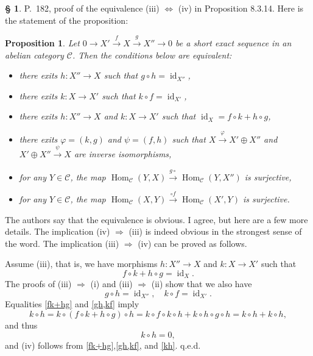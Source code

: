 \documentclass[12pt]{article}
\newtheorem{prop}[thm]{Proposition}
\theoremstyle{remark}
\theoremstyle{definition}
\newtheorem{s}[thm]{\S}
\newcommand{\C}{\mathcal C}
\newcommand{\pp}{\varphi}
\newcommand{\then}{\Rightarrow}
\newcommand{\ssi}{\Leftrightarrow}%
\newcommand{\xr}{\xrightarrow}
\DeclareMathOperator{\id}{id}
\DeclareMathOperator{\Hom}{Hom}%
\begin{document}
\begin{s} 
P.~182, proof of the equivalence (iii) $\ssi$ (iv) in Proposition 8.3.14. Here is the statement of the proposition:
%
\begin{prop}
Let $0\to X'\xr fX\xr gX''\to0$ be a short exact sequence in an abelian category $\C$. Then the conditions below are equivalent:
\begin{itemize}
\item[\em(i)] there exits $h:X''\to X$ such that $g\circ h=\id_{X''}$,
\item[\em(ii)] there exits $k:X\to X'$ such that $k\circ f=\id_{X'}$,
\item[\em(iii)] there exits $h:X''\to X$ and $k:X\to X'$ such that $\id_X=f\circ k+h\circ g$,
\item[\em(iv)] there exits $\pp=(k,g)$ and $\psi=(f,h)$ such that $X\xr\pp X'\oplus X''$ and $X'\oplus X''\xr\psi X$ are inverse isomorphisms,
\item[\em(v)] for any $Y\in\C$, the map $\Hom_\C(Y,X)\xr{g\circ}\Hom_\C(Y,X'')$ is surjective,
\item[\em(vi)] for any $Y\in\C$, the map $\Hom_\C(X,Y)\xr{\circ f}\Hom_\C(X',Y)$ is surjective.
\end{itemize}
\end{prop}

The authors say that the equivalence is obvious. I agree, but here are a few more details. The implication (iv) $\then$ (iii) is indeed obvious in the strongest sense of the word. The implication (iii) $\then$ (iv) can be proved as follows. 

Assume (iii), that is, we have morphisms $h:X''\to X$ and $k:X\to X'$ such that 
\begin{equation}\label{fk+hg} 
f\circ k+h\circ g=\id_X.
\end{equation} 
The proofs of (iii) $\then$ (i) and (iii) $\then$ (ii) show that we also have 
\begin{equation}\label{gh,kf} 
g\circ h=\id_{X''},\quad k\circ f=\id_{X'}.
\end{equation} 
Equalities \eqref{fk+hg} and \eqref{gh,kf} imply 
$$
k\circ h=k\circ(f\circ k+h\circ g)\circ h=k\circ f\circ k\circ h+k\circ h\circ g\circ h=k\circ h+k\circ h,
$$ 
and thus 
\begin{equation}\label{kh} 
k\circ h=0, 
\end{equation} 
and (iv) follows from \eqref{fk+hg},\eqref{gh,kf}, and \eqref{kh}. q.e.d.
\end{s}
%
\end{document}
